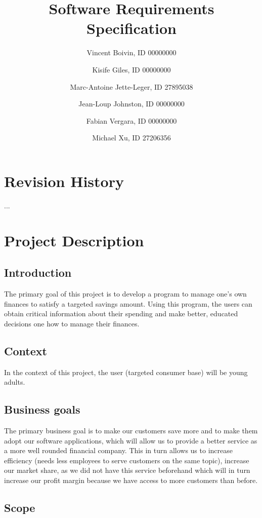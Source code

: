 \documentclass[letterpaper]{article}
\title{Software Requirements Specification}
\author{
	Vincent Boivin, ID 00000000 \and
	Kisife Giles, ID 00000000 \and
	Marc-Antoine Jette-Leger, ID 27895038 \and
	Jean-Loup Johnston, ID 00000000 \and
	Fabian Vergara, ID 00000000 \and
	Michael Xu, ID 27206356
}
\begin{document}
	
\maketitle

\newpage

\section{Revision History}

	...
	
\newpage

\tableofcontents

\newpage
	
\section{Project Description}

	\subsection{Introduction}
	
		The primary goal of this project is to develop a program to manage one’s own finances to satisfy a targeted savings amount. Using this program, the users can obtain critical information about their spending and make better, educated decisions one how to manage their finances.
	
	\subsection{Context}
	
		In the context of this project, the user (targeted consumer base) will be young adults. 
	
	\subsection{Business goals}
	
		The primary business goal is to make our customers save more and to make them adopt our software applications, which will allow us to provide a better service as a more well rounded financial company. This in turn allows us to increase efficiency (needs less employees to serve customers on the same topic), increase our market share, as we did not have this service beforehand which will in turn increase our profit margin because we have access to more customers than before.
	
	\subsection{Scope}
	
\end{document}
